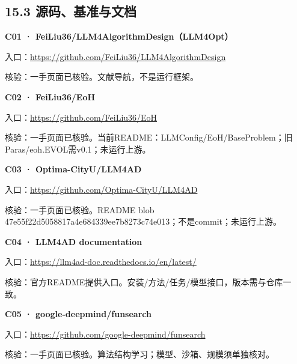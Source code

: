 \subsection{15.3
源码、基准与文档}\label{ux6e90ux7801ux57faux51c6ux4e0eux6587ux6863}

\par\noindent\begin{minipage}{\linewidth}
\textbf{C01 · FeiLiu36/LLM4AlgorithmDesign（LLM4Opt）}

入口：\url{https://github.com/FeiLiu36/LLM4AlgorithmDesign}

核验：一手页面已核验。文献导航，不是运行框架。
\end{minipage}\par\vspace{6pt}

\par\noindent\begin{minipage}{\linewidth}
\textbf{C02 · FeiLiu36/EoH}

入口：\url{https://github.com/FeiLiu36/EoH}

核验：一手页面已核验。当前README：LLMConfig/EoH/BaseProblem；旧Paras/eoh.EVOL需v0.1；未运行上游。
\end{minipage}\par\vspace{6pt}

\par\noindent\begin{minipage}{\linewidth}
\textbf{C03 · Optima-CityU/LLM4AD}

入口：\url{https://github.com/Optima-CityU/LLM4AD}

核验：一手页面已核验。README blob
47e55f22d5058817a4e684339ee7b8273c74e013；不是commit；未运行上游。
\end{minipage}\par\vspace{6pt}

\par\noindent\begin{minipage}{\linewidth}
\textbf{C04 · LLM4AD documentation}

入口：\url{https://llm4ad-doc.readthedocs.io/en/latest/}

核验：官方README提供入口。安装/方法/任务/模型接口，版本需与仓库一致。
\end{minipage}\par\vspace{6pt}

\par\noindent\begin{minipage}{\linewidth}
\textbf{C05 · google-deepmind/funsearch}

入口：\url{https://github.com/google-deepmind/funsearch}

核验：一手页面已核验。算法结构学习；模型、沙箱、规模须单独核对。
\end{minipage}\par\vspace{6pt}

